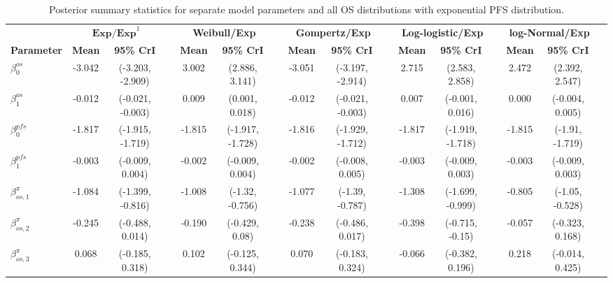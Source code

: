 \documentclass[AMA,STIX1COL]{WileyNJD-v2}
\begin{document}

\begin{landscape}
\begin{center}
\begin{table}[t]
\caption{Posterior summary statistics for separate model parameters and all OS distributions with exponential PFS distribution. \label{tab:post_sep_pfs_exp}}
\centering
\begin{tabular}{l c c c c c c c c c c c c c c c}
\toprule
\multicolumn{1}{l}{} & \multicolumn{2}{c}{$\textbf{Exp/Exp}^1$} & & \multicolumn{2}{c}{\textbf{Weibull/Exp}} & & \multicolumn{2}{c}{\textbf{Gompertz/Exp}} & & \multicolumn{2}{c}{\textbf{Log-logistic/Exp}} & & \multicolumn{2}{c}{\textbf{log-Normal/Exp}}\\
\cmidrule{2-3}\cmidrule{5-6}\cmidrule{8-9}\cmidrule{11-12}\cmidrule{14-15}
\textbf{Parameter} & \textbf{Mean} & \textbf{95\% CrI} & & \textbf{Mean} & \textbf{95\% CrI} & & \textbf{Mean} & \textbf{95\% CrI} & & \textbf{Mean} & \textbf{95\% CrI} & & \textbf{Mean} & \textbf{95\% CrI}\\
\midrule
$\beta^{os}_0$ & -3.042 & (-3.203, -2.909) &  & 3.002 & (2.886, 3.141) &  & -3.051 & (-3.197, -2.914) &  & 2.715 & (2.583, 2.858) &  & 2.472 & (2.392, 2.547) & \\
$\beta^{os}_1$ & -0.012 & (-0.021, -0.003) &  & 0.009 & (0.001, 0.018) &  & -0.012 & (-0.021, -0.003) &  & 0.007 & (-0.001, 0.016) &  & 0.000 & (-0.004, 0.005) & \\
$\beta^{pfs}_0$ & -1.817 & (-1.915, -1.719) &  & -1.815 & (-1.917, -1.728) &  & -1.816 & (-1.929, -1.712) &  & -1.817 & (-1.919, -1.718) &  & -1.815 & (-1.91, -1.719) & \\
$\beta^{pfs}_1$ & -0.003 & (-0.009, 0.004) &  & -0.002 & (-0.009, 0.004) &  & -0.002 & (-0.008, 0.005) &  & -0.003 & (-0.009, 0.003) &  & -0.003 & (-0.009, 0.003) & \\
$\beta^{\pi}_{os, 1}$ & -1.084 & (-1.399, -0.816) &  & -1.008 & (-1.32, -0.756) &  & -1.077 & (-1.39, -0.787) &  & -1.308 & (-1.699, -0.999) &  & -0.805 & (-1.05, -0.528) & \\
$\beta^{\pi}_{os, 2}$ & -0.245 & (-0.488, 0.014) &  & -0.190 & (-0.429, 0.08) &  & -0.238 & (-0.486, 0.017) &  & -0.398 & (-0.715, -0.15) &  & -0.057 & (-0.323, 0.168) & \\
$\beta^{\pi}_{os, 3}$ & 0.068 & (-0.185, 0.318) &  & 0.102 & (-0.125, 0.344) &  & 0.070 & (-0.183, 0.324) &  & -0.066 & (-0.382, 0.196) &  & 0.218 & (-0.014, 0.425) & \\

\end{tabular}
\end{table}
\end{center}
\end{landscape}
\end{document}
